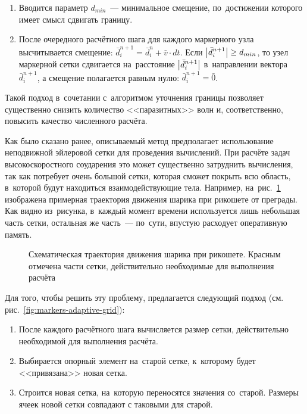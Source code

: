 \documentclass[thesis.tex]{subfiles}
\begin{document}
    \begin{enumerate}
        \item Вводится параметр $d_{min}$~--- минимальное смещение, по~достижении которого имеет смысл сдвигать границу.
        \item После очередного расчётного шага для каждого маркерного узла высчитывается смещение:
              $\bar d^{n+1}_i=\bar d^{n}_{i}+\bar v \cdot dt$. Если $\left|\bar d^{n+1}_i\right| \geq d_{min}$, то узел
              маркерной сетки сдвигается на~расстояние $\left|\bar d^{n+1}_i\right|$ в~направлении вектора $\bar d^{n+1}_i$, а
              смещение полагается равным нулю: $\bar d^{n+1}_i = \bar 0$.
    \end{enumerate}

    Такой подход в~сочетании с~алгоритмом уточнения границы позволяет существенно снизить количество <<паразитных>> волн и,
    соответственно, повысить качество численного расчёта.

    Как было сказано ранее, описываемый метод предполагает использование неподвижной эйлеровой сетки для проведения
    вычислений. При расчёте задач высокоскоростного соударения это может существенно затруднить вычисления, так как
    потребует очень большой сетки, которая сможет покрыть всю область, в~которой будут находиться взаимодействующие
    тела. Например, на~рис.~\ref{fig:markers-ricochet} изображена примерная траектория движения шарика при рикошете от
    преграды. Как видно из~рисунка, в~каждый момент времени используется лишь небольшая часть сетки, остальная же часть~---
    по~сути, впустую расходует оперативную память.

    \begin{figure}[h!]
        \centering
        \caption{Схематическая траектория движения шарика при рикошете. Красным отмечена части сетки, действительно
            необходимые для выполнения расчёта}
        \label{fig:markers-ricochet}
    \end{figure}

    Для того, чтобы решить эту проблему, предлагается следующий подход (см. рис.~\ref{fig:markers-adaptive-grid}):

    \begin{enumerate}
        \item После каждого расчётного шага вычисляется размер сетки, действительно необходимой для выполнения расчёта.
        \item Выбирается опорный элемент на~старой сетке, к~которому будет <<привязана>> новая сетка.
        \item Строится новая сетка, на~которую переносятся значения со~старой. Размеры ячеек новой сетки совпадают с
              таковыми для старой.
    \end{enumerate}
\end{document}
